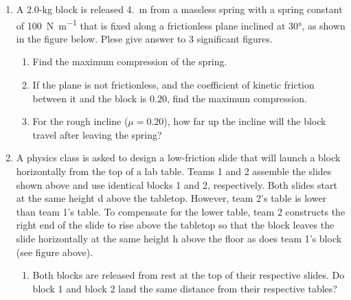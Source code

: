 \documentclass{../../../oss-apphys}
\begin{document}
\begin{enumerate}[leftmargin=15pt]
\item A $2.0$-\si{\kilo\gram} block is released \SI{4.}{\metre} from a massless
  spring with a spring constant of \SI{100}{\newton\per\metre} that is fixed
  along a frictionless plane inclined at \ang{30}, as shown in the figure below.
  Plese give answer to $3$ significant figures.
  \begin{center}
  \end{center}
  \begin{enumerate}[noitemsep,leftmargin=20pt]
  \item Find the maximum compression of the spring.
  \item If the plane is not frictionless, and the coefficient of kinetic
    friction between it and the block is $0.20$, find the maximum compression.
  \item For the rough incline ($\mu=0.20$), how far up the incline will the
    block travel after leaving the spring?
  \end{enumerate}
  \newpage

  \begin{center}
  \end{center}
\item A physics class is asked to design a low-friction slide that will launch
  a block horizontally from the top of a lab table. Teams 1 and 2 assemble the
  slides shown above and use identical blocks 1 and 2, respectively. Both
  slides start at the same height d above the tabletop. However, team 2's table
  is lower than team 1's table. To compensate for the lower table, team 2
  constructs the right end of the slide to rise above the tabletop so that the
  block leaves the slide horizontally at the same height h above the floor as
  does team 1's block (see figure above).
  \begin{enumerate}[noitemsep,leftmargin=20pt]
  \item Both blocks are released from rest at the top of their respective
    slides. Do block 1 and block 2 land the same distance from their respective
    tables?


\end{enumerate}
\end{enumerate}
\end{document}
